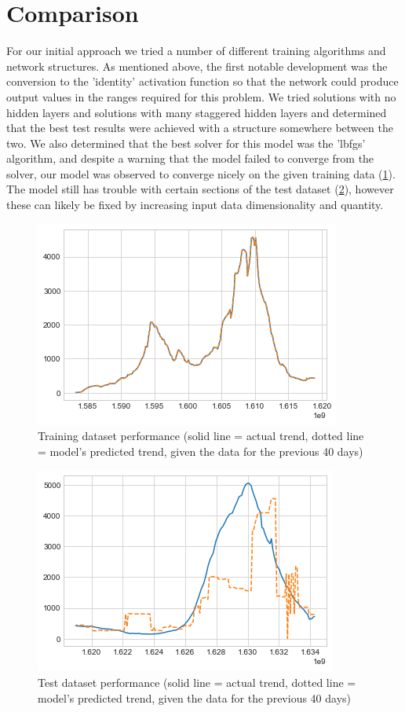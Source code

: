 \documentclass[conference]{IEEEtran}
\begin{document}
\section{Comparison}
For our initial approach we tried a number of different training algorithms and network structures. As mentioned above, the first notable development was the conversion to the 'identity' activation function so that the network could produce output values in the ranges required for this problem. We tried solutions with no hidden layers and solutions with many staggered hidden layers and determined that the best test results were achieved with a structure somewhere between the two. We also determined that the best solver for this model was the 'lbfgs' algorithm, and despite a warning that the model failed to converge from the solver, our model was observed to converge nicely on the given training data (\ref{fig:training_accuracy}). The model still has trouble with certain sections of the test dataset (\ref{fig:test_accuracy}), however these can likely be fixed by increasing input data dimensionality and quantity.

\begin{figure}
    \centering
    \includegraphics[scale=0.6]{resources/alabama_training.png}
    \caption{Training dataset performance (solid line = actual trend, dotted line = model's predicted trend, given the data for the previous 40 days)}
    \label{fig:training_accuracy}
\end{figure}

\begin{figure}
    \centering
    \includegraphics[scale=0.6]{resources/alabama_test.png}
    \caption{Test dataset performance (solid line = actual trend, dotted line = model's predicted trend, given the data for the previous 40 days)}
    \label{fig:test_accuracy}
\end{figure}
\end{document}
